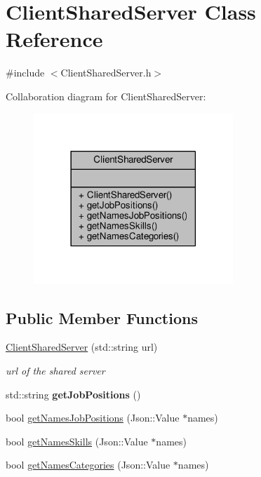\hypertarget{classClientSharedServer}{}\section{Client\+Shared\+Server Class Reference}
\label{classClientSharedServer}


{\ttfamily \#include $<$Client\+Shared\+Server.\+h$>$}



Collaboration diagram for Client\+Shared\+Server\+:\nopagebreak
\begin{figure}[H]
\begin{center}
\leavevmode
\includegraphics[width=213pt]{d9/dd4/classClientSharedServer__coll__graph}
\end{center}
\end{figure}
\subsection*{Public Member Functions}
\begin{DoxyCompactItemize}
\item 
\hyperlink{classClientSharedServer_a62284b905408f5b051003941142183ea}{Client\+Shared\+Server} (std\+::string url)\hypertarget{classClientSharedServer_a62284b905408f5b051003941142183ea}{}\label{classClientSharedServer_a62284b905408f5b051003941142183ea}

\begin{DoxyCompactList}\small\item\em url of the shared server \end{DoxyCompactList}\item 
std\+::string {\bfseries get\+Job\+Positions} ()\hypertarget{classClientSharedServer_a5aa2cc5bd2459fd69ab09c8e91431e31}{}\label{classClientSharedServer_a5aa2cc5bd2459fd69ab09c8e91431e31}

\item 
bool \hyperlink{classClientSharedServer_af5e6b2fc5be7dea4778c38c757267cdf}{get\+Names\+Job\+Positions} (Json\+::\+Value $\ast$names)
\item 
bool \hyperlink{classClientSharedServer_a03de2db456340fccc4bee6e89e20bc84}{get\+Names\+Skills} (Json\+::\+Value $\ast$names)
\item 
bool \hyperlink{classClientSharedServer_ac80766f7c0f6a4cdf3210a27ed72a8a6}{get\+Names\+Categories} (Json\+::\+Value $\ast$names)
\end{DoxyCompactItemize}


